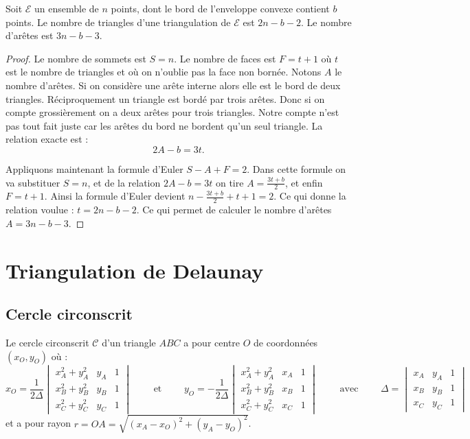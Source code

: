 \documentclass[11pt,class=report,crop=false]{standalone}
\begin{document}
\begin{proposition}
	Soit $\mathcal{E}$ un ensemble de $n$ points, dont le bord de l'enveloppe convexe contient $b$ points.
	Le nombre de triangles d'une triangulation de $\mathcal{E}$ est $2n-b-2$.
	Le nombre d'arêtes est $3n-b-3$.
\end{proposition}	

\begin{proof}
Le nombre de sommets est $S = n$.
Le nombre de faces est $F = t+1$ où $t$ est le nombre de triangles et où on n'oublie pas la face non bornée.
Notons $A$ le nombre d'arêtes.
Si on considère une arête interne alors elle est le bord de deux triangles.
Réciproquement un triangle est bordé par trois arêtes. Donc si on compte grossièrement on a deux arêtes pour trois triangles. Notre compte n'est pas tout fait juste car les arêtes du bord ne bordent qu'un seul triangle. La relation exacte est :
$$2A -b = 3t.$$


Appliquons maintenant la formule d'Euler $S-A+F=2$.
Dans cette formule on va substituer $S=n$,
et de la relation $2A-b=3t$ on tire $A=\frac{3t+b}{2}$, et enfin $F=t+1$.
Ainsi la formule d'Euler devient
$n-\frac{3t+b}{2} + t+1 = 2$. Ce qui donne la relation voulue : $t = 2n-b-2$.
Ce qui permet de calculer le nombre d'arêtes $A = 3n-b-3$.
\end{proof}


\section{Triangulation de Delaunay}


\subsection{Cercle circonscrit}

\begin{proposition}

Le cercle circonscrit $\mathcal{C}$ d'un triangle $ABC$ a pour centre
$O$ de coordonnées $(x_O,y_O)$ où :
$$x_O = \frac{1}{2\Delta}\begin{vmatrix}x_A^2+y_A^2 & y_A & 1 \\ x_B^2+y_B^2 & y_B & 1 \\ x_C^2+y_C^2 & y_C & 1 \end{vmatrix}
\qquad \text{ et } \qquad 
y_O = -\frac{1}{2\Delta}\begin{vmatrix}x_A^2+y_A^2 & x_A & 1 \\ x_B^2+y_B^2 & x_B & 1 \\ x_C^2+y_C^2 & x_C & 1 \end{vmatrix}
\qquad \text{ avec } \qquad
\Delta= \begin{vmatrix}x_A & y_A & 1 \\ x_B & y_B & 1 \\ x_C & y_C & 1 \end{vmatrix}
$$
et a pour rayon 
$r = OA = \sqrt{ (x_A-x_O)^2 + (y_A-y_O)^2 }$.
\end{proposition}	
\end{document}
